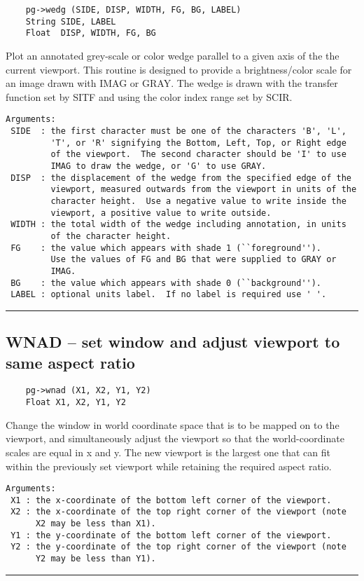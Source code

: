 \begin{verbatim}
    pg->wedg (SIDE, DISP, WIDTH, FG, BG, LABEL)
    String SIDE, LABEL
    Float  DISP, WIDTH, FG, BG
\end{verbatim}

Plot an annotated grey-scale or color wedge parallel to a given axis
of the the current viewport.  This routine is designed to provide a
brightness/color scale for an image drawn with IMAG or GRAY.  The
wedge is  drawn with the transfer function set by SITF and using
the color index range set by SCIR.

\begin{verbatim}
Arguments:
 SIDE  : the first character must be one of the characters 'B', 'L',
         'T', or 'R' signifying the Bottom, Left, Top, or Right edge
         of the viewport.  The second character should be 'I' to use
         IMAG to draw the wedge, or 'G' to use GRAY. 
 DISP  : the displacement of the wedge from the specified edge of the
         viewport, measured outwards from the viewport in units of the
         character height.  Use a negative value to write inside the
         viewport, a positive value to write outside. 
 WIDTH : the total width of the wedge including annotation, in units
         of the character height. 
 FG    : the value which appears with shade 1 (``foreground'').
         Use the values of FG and BG that were supplied to GRAY or
         IMAG. 
 BG    : the value which appears with shade 0 (``background''). 
 LABEL : optional units label.  If no label is required use ' '. 
\end{verbatim}

\hrule

\subsection*{WNAD -- set window and adjust viewport to same aspect ratio }

\begin{verbatim}
    pg->wnad (X1, X2, Y1, Y2)
    Float X1, X2, Y1, Y2
\end{verbatim}

Change the window in world coordinate space that is to be mapped on to
the viewport, and simultaneously adjust the viewport so that the
world-coordinate scales are equal in x and y.  The new viewport is the
largest one that can fit within the previously set viewport while
retaining the required aspect ratio.

\begin{verbatim}
Arguments:
 X1 : the x-coordinate of the bottom left corner of the viewport. 
 X2 : the x-coordinate of the top right corner of the viewport (note
      X2 may be less than X1). 
 Y1 : the y-coordinate of the bottom left corner of the viewport. 
 Y2 : the y-coordinate of the top right corner of the viewport (note
      Y2 may be less than Y1). 
\end{verbatim}

\hrule

